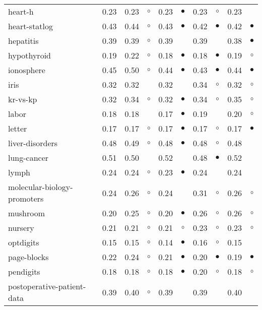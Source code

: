 {\begin{longtable}{lrr@{\hspace{0.1cm}}cr@{\hspace{0.1cm}}cr@{\hspace{0.1cm}}cr@{\hspace{0.1cm}}c}
heart-h & 0.23 & 0.23 &   $\circ$ & 0.23 & $\bullet$ & 0.23 &   $\circ$ & 0.23 &           \\
heart-statlog & 0.43 & 0.44 &   $\circ$ & 0.43 & $\bullet$ & 0.42 & $\bullet$ & 0.42 &  $\bullet$\\
hepatitis & 0.39 & 0.39 &   $\circ$ & 0.39 &           & 0.39 &           & 0.38 &  $\bullet$\\
hypothyroid & 0.19 & 0.22 &   $\circ$ & 0.18 & $\bullet$ & 0.18 & $\bullet$ & 0.19 &    $\circ$\\
ionosphere & 0.45 & 0.50 &   $\circ$ & 0.44 & $\bullet$ & 0.43 & $\bullet$ & 0.44 &  $\bullet$\\
iris & 0.32 & 0.32 &           & 0.32 &           & 0.34 &   $\circ$ & 0.32 &    $\circ$\\
kr-vs-kp & 0.32 & 0.34 &   $\circ$ & 0.32 & $\bullet$ & 0.34 &   $\circ$ & 0.35 &    $\circ$\\
labor & 0.18 & 0.18 &           & 0.17 & $\bullet$ & 0.19 &           & 0.20 &    $\circ$\\
letter & 0.17 & 0.17 &   $\circ$ & 0.17 & $\bullet$ & 0.17 &   $\circ$ & 0.17 &  $\bullet$\\
liver-disorders & 0.48 & 0.49 &   $\circ$ & 0.48 & $\bullet$ & 0.48 &   $\circ$ & 0.48 &           \\
lung-cancer & 0.51 & 0.50 &           & 0.52 &           & 0.48 & $\bullet$ & 0.52 &           \\
lymph & 0.24 & 0.24 &   $\circ$ & 0.23 & $\bullet$ & 0.24 &           & 0.24 &           \\
molecular-biology-promoters & 0.24 & 0.26 &   $\circ$ & 0.24 &           & 0.31 &   $\circ$ & 0.26 &    $\circ$\\
mushroom & 0.20 & 0.25 &   $\circ$ & 0.20 & $\bullet$ & 0.26 &   $\circ$ & 0.26 &    $\circ$\\
nursery & 0.21 & 0.21 &   $\circ$ & 0.21 &   $\circ$ & 0.23 &   $\circ$ & 0.23 &    $\circ$\\
optdigits & 0.15 & 0.15 &   $\circ$ & 0.14 & $\bullet$ & 0.16 &   $\circ$ & 0.15 &           \\
page-blocks & 0.22 & 0.24 &   $\circ$ & 0.21 & $\bullet$ & 0.20 & $\bullet$ & 0.19 &  $\bullet$\\
pendigits & 0.18 & 0.18 &   $\circ$ & 0.18 & $\bullet$ & 0.20 &   $\circ$ & 0.18 &    $\circ$\\
postoperative-patient-data & 0.39 & 0.40 &   $\circ$ & 0.39 &           & 0.39 &           & 0.40 &           \\

\end{longtable}}
